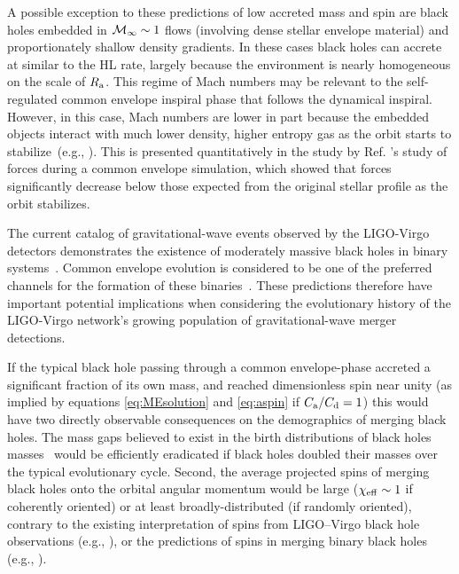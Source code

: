 A possible exception to these predictions of low accreted mass and spin are black holes embedded in ${\cal M}_\infty \sim 1$ flows (involving dense stellar envelope material) and proportionately shallow density gradients. In these cases black holes can accrete at similar to the HL rate, largely because the environment is nearly homogeneous on the scale of $R_{\rm a}$. This regime of Mach numbers may be relevant to the self-regulated common envelope inspiral phase that follows the dynamical inspiral. However, in this case, Mach numbers are lower in part because the embedded objects interact with  much lower density, higher entropy gas as the orbit starts to stabilize~(e.g., \cite{Ohlmann:2016b,Ivanova:2016, Iaconi:2018,Chamandy:2019psk}). This is presented quantitatively in the study by Ref. \cite{Chamandy:2019psk}'s study of forces during a common envelope simulation, which showed that forces significantly decrease below those expected from the original stellar profile as the orbit stabilizes. 

The current catalog of gravitational-wave events observed by the LIGO-Virgo detectors demonstrates the existence of moderately massive black holes in binary systems~\cite{Abbott:2016blz,TheLIGOScientific:2016pea,Nitz:2018imz,Nitz:2019hdf,Biwer:2018osg,Abbott:2017vtc,Abbott:2017gyy,Abbott:2017oio,Zackay:2019tzo,Venumadhav:2019lyq,LIGOScientific:2018mvr,De:2018zrk}. Common envelope evolution is considered to be one of the preferred channels for the formation of these binaries~\cite{Kruckow:2016tti,Belczynski:2016obo,EldridgeStanway:2016,Stevenson:2017,Mapelli:2018}. These predictions therefore have important potential implications when considering the evolutionary history of the LIGO-Virgo network's growing population of gravitational-wave merger detections. 

If the typical black hole passing through a common envelope-phase accreted a significant fraction of its own mass, and reached dimensionless spin near unity (as implied by equations \eqref{eq:MEsolution} and \eqref{eq:aspin} if $C_{\rm a}/C_{\rm d}=1$) this would have two directly observable consequences on the demographics of merging black holes. The mass gaps believed to exist in the birth distributions of black holes masses~\cite{Bailyn:1998,Kreidberg:2012,Ozel:2010,Farr:2011,Yusof:2013,Belczynski:2014,Marchant:2016,Woosley:2017} would be efficiently eradicated if black holes doubled their masses over the typical evolutionary cycle. Second, the average projected spins of merging black holes onto the orbital angular momentum would be large ($\chi_{\rm eff}\sim 1$ if coherently oriented) or at least broadly-distributed (if randomly oriented), contrary to the existing interpretation of spins from LIGO--Virgo black hole observations (e.g., \cite{Farr:2017uvj,Farr:2017gtv,Tiwari:2018qch,Piran_2019}), or the predictions of spins in merging binary black holes (e.g., \cite{Bavera:2019fkg,Fuller:2019sxi,Zaldarriaga:2017qkw,Kushnir:2016zee,Schroder:2018hxk,Batta:2019clm}). 

